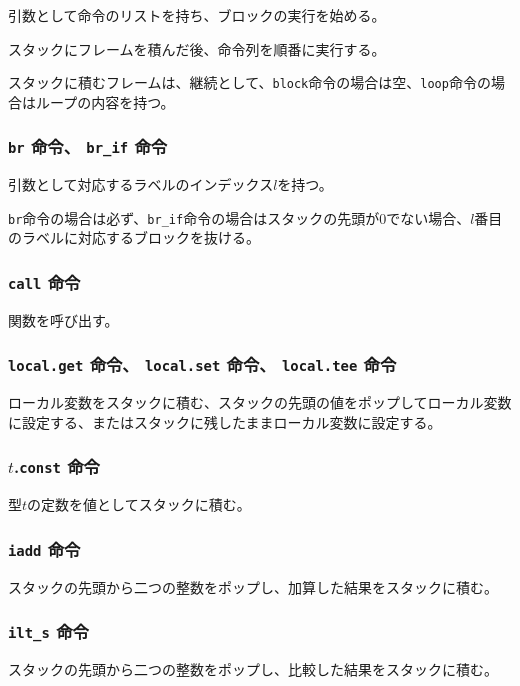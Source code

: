 引数として命令のリストを持ち、ブロックの実行を始める。

スタックにフレームを積んだ後、命令列を順番に実行する。

スタックに積むフレームは、継続として、\verb|block|命令の場合は空、\verb|loop|命令の場合はループの内容を持つ。

\subsubsection{{\tt br} 命令、 {\tt br\_if} 命令}

引数として対応するラベルのインデックス$l$を持つ。

\verb|br|命令の場合は必ず、\verb|br_if|命令の場合はスタックの先頭が0でない場合、$l$番目のラベルに対応するブロックを抜ける。

\subsubsection{{\tt call} 命令}

関数を呼び出す。

\subsubsection{{\tt local.get} 命令、 {\tt local.set} 命令、 {\tt local.tee} 命令}

ローカル変数をスタックに積む、スタックの先頭の値をポップしてローカル変数に設定する、またはスタックに残したままローカル変数に設定する。

\subsubsection{$t$.{\tt const} 命令}

型$t$の定数を値としてスタックに積む。

\subsubsection{{\tt iadd} 命令}

スタックの先頭から二つの整数をポップし、加算した結果をスタックに積む。

\subsubsection{{\tt ilt\_s} 命令}

スタックの先頭から二つの整数をポップし、比較した結果をスタックに積む。

